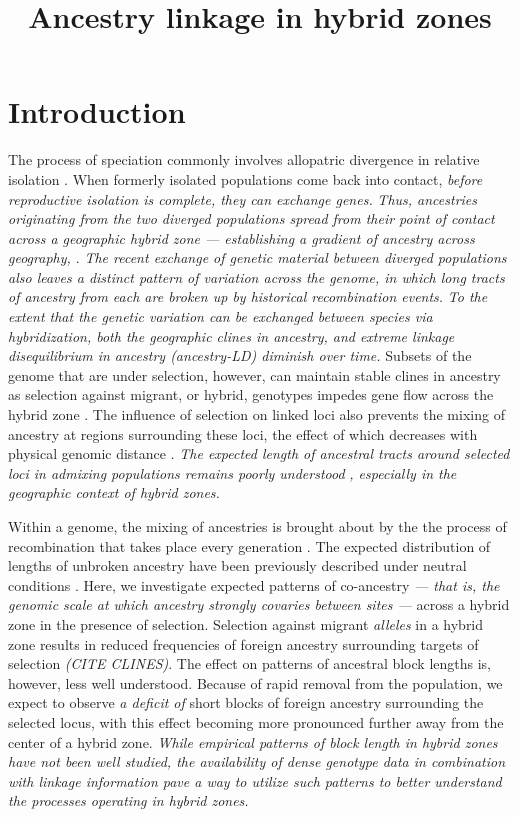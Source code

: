 \documentclass[12pt]{article}
\title{Ancestry linkage in hybrid zones}
\author{}
\date{} %
\newcommand{\alisa}[1]{{\em \color{red} #1}}
\newcommand{\yb}[1]{{\em \color{magenta} #1}}
\begin{document}
\maketitle


\section{Introduction}
The process of speciation commonly involves allopatric divergence in relative isolation \citep{Coyne2004}.  
When formerly isolated populations come back into contact, \yb{before reproductive isolation is complete, they can exchange genes.}  
\yb{Thus, \alisa{ancestries} originating from the two diverged populations spread from their point of contact across a geographic hybrid zone --- establishing a gradient of ancestry across geography, \citep{Barton1985}}. 
\yb{The recent exchange of genetic material between diverged populations also leaves a distinct pattern of variation across the genome, in which long tracts of ancestry from each  are broken up by historical recombination events.}  
\yb{To the extent that the genetic variation can be exchanged between species via hybridization, both the geographic clines in ancestry, and extreme linkage disequilibrium in ancestry (ancestry-LD) diminish over time.} 
Subsets of the genome that are under selection, however, can maintain stable clines in ancestry as selection against migrant, or hybrid, genotypes impedes gene flow across the hybrid zone \citep{Barton1979a}. 
The influence of selection on linked loci also prevents the mixing of ancestry at regions surrounding these loci, the effect of which decreases with physical genomic distance \citep{Barton1986}. 
\yb{The expected length of ancestral tracts around selected loci in admixing populations remains poorly understood}\alisa{, especially in the geographic context of hybrid zones.}


Within a genome, the mixing of ancestries is brought about by the the process of recombination that takes place every generation \citep{Fisher1954, Chapman2002, Baird2003}.   
The expected distribution of lengths of unbroken ancestry have been previously described under neutral conditions \cite[e.g.][]{Gravel2012,Sedghifar2015}.  
Here, we investigate expected patterns of co-ancestry \yb{ --- that is, the genomic scale at which ancestry strongly covaries between sites --- } across a hybrid zone in the presence of selection. 
Selection against migrant \yb{alleles} in a hybrid zone results in reduced frequencies of foreign ancestry surrounding targets of selection \yb{(CITE CLINES)}. 
The effect on patterns of ancestral block lengths is, however, less well understood. 
Because of rapid removal from the population, we expect to observe \yb{a deficit of} short blocks of foreign ancestry surrounding the selected locus, with this effect becoming more pronounced further away from the center of a hybrid zone. 
\alisa{While empirical patterns of block length in hybrid zones have not been well studied, the availability of dense genotype data in combination with linkage information pave a way to utilize such patterns to better understand the processes operating in hybrid zones. } %
\end{document}
